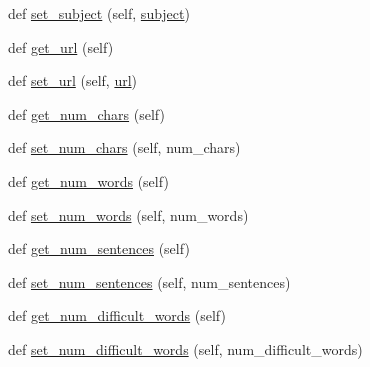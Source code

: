 \begin{DoxyCompactItemize}
def \mbox{\hyperlink{classbridges_1_1data__src__dependent_1_1book_1_1_book_aa32c5ebd5c35cd9935b3905406201062}{set\+\_\+subject}} (self, \mbox{\hyperlink{classbridges_1_1data__src__dependent_1_1book_1_1_book_a76a1f4fd58fdebd2095e373253124ea2}{subject}})
\item 
def \mbox{\hyperlink{classbridges_1_1data__src__dependent_1_1book_1_1_book_af6bc460010a094021522f4aee15bdeed}{get\+\_\+url}} (self)
\item 
def \mbox{\hyperlink{classbridges_1_1data__src__dependent_1_1book_1_1_book_a8c68b342b0195e64a313d41453e8d863}{set\+\_\+url}} (self, \mbox{\hyperlink{classbridges_1_1data__src__dependent_1_1book_1_1_book_a786ef9922b8aab860dd84cc0be2b437e}{url}})
\item 
def \mbox{\hyperlink{classbridges_1_1data__src__dependent_1_1book_1_1_book_ad2499cb422680949c235dca32aac6222}{get\+\_\+num\+\_\+chars}} (self)
\item 
def \mbox{\hyperlink{classbridges_1_1data__src__dependent_1_1book_1_1_book_a8b2c2602d0b6a7c5cba968f16584b140}{set\+\_\+num\+\_\+chars}} (self, num\+\_\+chars)
\item 
def \mbox{\hyperlink{classbridges_1_1data__src__dependent_1_1book_1_1_book_a08fd6f644db9a9de59b5edc181fef6e2}{get\+\_\+num\+\_\+words}} (self)
\item 
def \mbox{\hyperlink{classbridges_1_1data__src__dependent_1_1book_1_1_book_ae189923e66c4371ca85fe832ec5096b6}{set\+\_\+num\+\_\+words}} (self, num\+\_\+words)
\item 
def \mbox{\hyperlink{classbridges_1_1data__src__dependent_1_1book_1_1_book_aad2eb3e3d0e47e12eca565e6e66810e5}{get\+\_\+num\+\_\+sentences}} (self)
\item 
def \mbox{\hyperlink{classbridges_1_1data__src__dependent_1_1book_1_1_book_a6d07e7acd9c9bc034eb0ffec151adc92}{set\+\_\+num\+\_\+sentences}} (self, num\+\_\+sentences)
\item 
def \mbox{\hyperlink{classbridges_1_1data__src__dependent_1_1book_1_1_book_aa8217ef8f6f031a765fc00ed91ab82b9}{get\+\_\+num\+\_\+difficult\+\_\+words}} (self)
\item 
def \mbox{\hyperlink{classbridges_1_1data__src__dependent_1_1book_1_1_book_a29b09c6e4d183a414b2e5f167ac907b0}{set\+\_\+num\+\_\+difficult\+\_\+words}} (self, num\+\_\+difficult\+\_\+words)
\end{DoxyCompactItemize}
